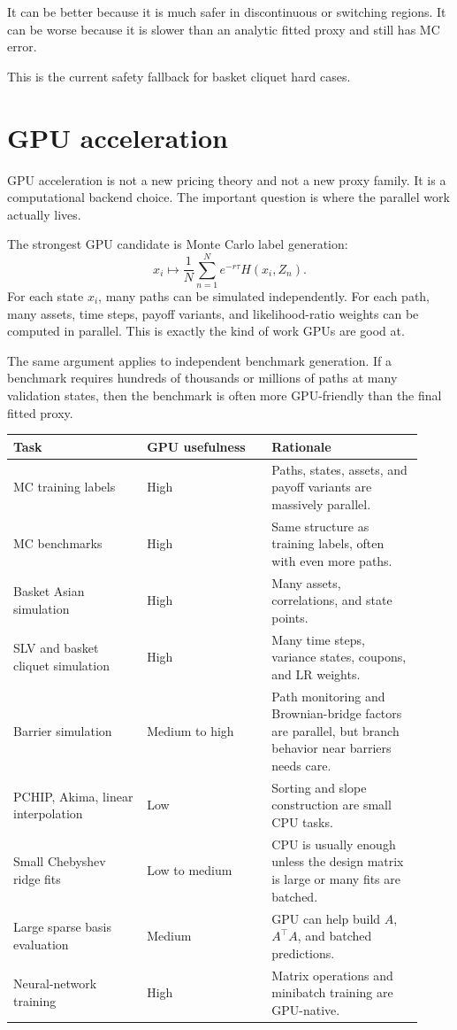 \documentclass[11pt,oneside]{book}
\theoremstyle{definition}
\begin{document}
It can be better because it is much safer in discontinuous or switching
regions. It can be worse because it is slower than an analytic fitted proxy and
still has MC error.

This is the current safety fallback for basket cliquet hard cases.

\section{GPU acceleration}
GPU acceleration is not a new pricing theory and not a new proxy family. It is
a computational backend choice. The important question is where the parallel
work actually lives.

The strongest GPU candidate is Monte Carlo label generation:
\[
  x_i \longmapsto
  \frac1N\sum_{n=1}^N e^{-r\tau}H(x_i,Z_n).
\]
For each state \(x_i\), many paths can be simulated independently. For each
path, many assets, time steps, payoff variants, and likelihood-ratio weights
can be computed in parallel. This is exactly the kind of work GPUs are good at.

The same argument applies to independent benchmark generation. If a benchmark
requires hundreds of thousands or millions of paths at many validation states,
then the benchmark is often more GPU-friendly than the final fitted proxy.

\begin{longtable}{@{}>{\raggedright\arraybackslash}p{0.30\linewidth}>{\raggedright\arraybackslash}p{0.28\linewidth}>{\raggedright\arraybackslash}p{0.34\linewidth}@{}}
\toprule
Task & GPU usefulness & Rationale\\
\midrule
MC training labels & High & Paths, states, assets, and payoff variants are massively parallel.\\
MC benchmarks & High & Same structure as training labels, often with even more paths.\\
Basket Asian simulation & High & Many assets, correlations, and state points.\\
SLV and basket cliquet simulation & High & Many time steps, variance states, coupons, and LR weights.\\
Barrier simulation & Medium to high & Path monitoring and Brownian-bridge factors are parallel, but branch behavior near barriers needs care.\\
PCHIP, Akima, linear interpolation & Low & Sorting and slope construction are small CPU tasks.\\
Small Chebyshev ridge fits & Low to medium & CPU is usually enough unless the design matrix is large or many fits are batched.\\
Large sparse basis evaluation & Medium & GPU can help build \(A\), \(A^\top A\), and batched predictions.\\
Neural-network training & High & Matrix operations and minibatch training are GPU-native.\\
\bottomrule
\end{longtable}
\end{document}
